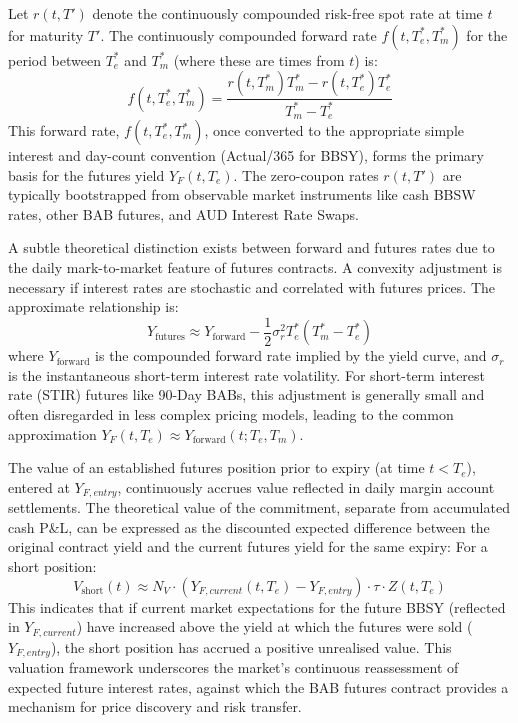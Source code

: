 \documentclass[11pt, a4paper, british]{article}
\begin{document}
Let $r(t, T')$ denote the continuously compounded risk-free spot rate at time $t$ for maturity $T'$. The continuously compounded forward rate $f(t, T_e^*, T_m^*)$ for the period between $T_e^*$ and $T_m^*$ (where these are times from $t$) is:
\begin{equation} \label{eq:cont_forward_rate}
 f(t, T_e^*, T_m^*) = \frac{r(t, T_m^*)T_m^* - r(t, T_e^*)T_e^*}{T_m^* - T_e^*}
\end{equation}
This forward rate, $f(t, T_e^*, T_m^*)$, once converted to the appropriate simple interest and day-count convention (Actual/365 for BBSY), forms the primary basis for the futures yield $Y_F(t, T_e)$. The zero-coupon rates $r(t, T')$ are typically bootstrapped from observable market instruments like cash BBSW rates, other BAB futures, and AUD Interest Rate Swaps.

A subtle theoretical distinction exists between forward and futures rates due to the daily mark-to-market feature of futures contracts. A convexity adjustment is necessary if interest rates are stochastic and correlated with futures prices. The approximate relationship is:
\begin{equation} \label{eq:convexity_adjustment}
 Y_{\text{futures}} \approx Y_{\text{forward}} - \frac{1}{2} \sigma_r^2 T_e^* (T_m^* - T_e^*)
\end{equation}
where $Y_{\text{forward}}$ is the compounded forward rate implied by the yield curve, and $\sigma_r$ is the instantaneous short-term interest rate volatility. For short-term interest rate (STIR) futures like 90-Day BABs, this adjustment is generally small and often disregarded in less complex pricing models, leading to the common approximation $Y_F(t, T_e) \approx Y_{\text{forward}}(t; T_e, T_m)$.

The value of an established futures position prior to expiry (at time $t < T_e$), entered at $Y_{F, entry}$, continuously accrues value reflected in daily margin account settlements. The theoretical value of the commitment, separate from accumulated cash P\&L, can be expressed as the discounted expected difference between the original contract yield and the current futures yield for the same expiry:
For a short position:
\begin{equation} \label{eq:futures_valuation_t}
 V_{\text{short}}(t) \approx N_V \cdot (Y_{F,current}(t,T_e) - Y_{F,entry}) \cdot \tau \cdot Z(t, T_e)
\end{equation}
This indicates that if current market expectations for the future BBSY (reflected in $Y_{F, current}$) have increased above the yield at which the futures were sold ($Y_{F, entry}$), the short position has accrued a positive unrealised value. This valuation framework underscores the market's continuous reassessment of expected future interest rates, against which the BAB futures contract provides a mechanism for price discovery and risk transfer.
\newpage
\end{document}

